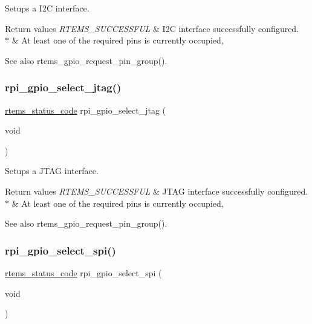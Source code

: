 Setups a I2C interface. 


\begin{DoxyRetVals}{Return values}
{\em R\+T\+E\+M\+S\+\_\+\+S\+U\+C\+C\+E\+S\+S\+F\+UL} & I2C interface successfully configured. \\
\hline
{\em $\ast$} & At least one of the required pins is currently occupied, \\
\hline
\end{DoxyRetVals}
\begin{DoxySeeAlso}{See also}
rtems\+\_\+gpio\+\_\+request\+\_\+pin\+\_\+group(). 
\end{DoxySeeAlso}
\mbox{\label{rpi-gpio_8h_ab31aee23a17b307e47076c1877f5736e}} 
\subsubsection{\texorpdfstring{rpi\_gpio\_select\_jtag()}{rpi\_gpio\_select\_jtag()}}
{\footnotesize\ttfamily \mbox{\hyperlink{group__ClassicStatus_ga545d41846817eaba6143d52ee4d9e9fe}{rtems\+\_\+status\+\_\+code}} rpi\+\_\+gpio\+\_\+select\+\_\+jtag (\begin{DoxyParamCaption}\item[{void}]{ }\end{DoxyParamCaption})}



Setups a J\+T\+AG interface. 


\begin{DoxyRetVals}{Return values}
{\em R\+T\+E\+M\+S\+\_\+\+S\+U\+C\+C\+E\+S\+S\+F\+UL} & J\+T\+AG interface successfully configured. \\
\hline
{\em $\ast$} & At least one of the required pins is currently occupied, \\
\hline
\end{DoxyRetVals}
\begin{DoxySeeAlso}{See also}
rtems\+\_\+gpio\+\_\+request\+\_\+pin\+\_\+group(). 
\end{DoxySeeAlso}
\mbox{\label{rpi-gpio_8h_a2546c0dc5eb7c840fe712e9ac748e6a9}} 
\subsubsection{\texorpdfstring{rpi\_gpio\_select\_spi()}{rpi\_gpio\_select\_spi()}}
{\footnotesize\ttfamily \mbox{\hyperlink{group__ClassicStatus_ga545d41846817eaba6143d52ee4d9e9fe}{rtems\+\_\+status\+\_\+code}} rpi\+\_\+gpio\+\_\+select\+\_\+spi (\begin{DoxyParamCaption}\item[{void}]{ }\end{DoxyParamCaption})}



